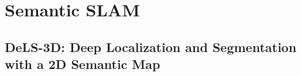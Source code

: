 \chapter{Semantic SLAM}

\section{DeLS-3D: Deep Localization and Segmentation with a 2D Semantic Map}



